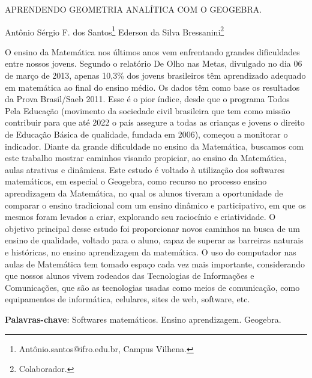 \documentclass[article,12pt,onesidea,4paper,english,brazil]{abntex2}
\begin{document}
	
	
	\frenchspacing 
	
	\begin{center}
		\LARGE APRENDENDO GEOMETRIA ANALÍTICA COM O GEOGEBRA.
		
		\normalsize
    	Antônio Sérgio F. dos Santos\footnote{Antônio.santos@ifro.edu.br, Campus Vilhena.} 
		Ederson da Silva Bressanini\footnote{Colaborador.} 
	\end{center}
	
	\noindent O ensino da Matemática nos últimos anos vem enfrentando grandes dificuldades entre nossos jovens. Segundo o relatório De Olho nas Metas, divulgado no dia 06 de março de 2013, apenas 10,3\% dos jovens brasileiros têm aprendizado adequado em matemática ao final do ensino médio. Os dados têm como base os resultados da Prova Brasil/Saeb 2011. Esse é o pior índice, desde que o programa Todos Pela Educação (movimento da sociedade civil brasileira que tem como missão contribuir para que até 2022 o país assegure a todas as crianças e jovens o direito de Educação Básica de qualidade, fundada em 2006), começou a monitorar o indicador. Diante da grande dificuldade no ensino da Matemática, buscamos com este trabalho mostrar caminhos visando propiciar, ao ensino da Matemática, aulas atrativas e dinâmicas. Este estudo é voltado à utilização dos softwares matemáticos, em especial o Geogebra, como recurso no processo ensino aprendizagem da Matemática, no qual os alunos tiveram a oportunidade de comparar o ensino tradicional com um ensino dinâmico e participativo, em que os mesmos foram levados a criar, explorando seu raciocínio e criatividade. O objetivo principal desse estudo foi proporcionar novos caminhos na busca de um ensino de qualidade, voltado para o aluno, capaz de superar as barreiras naturais e históricas, no ensino aprendizagem da matemática. O uso do computador nas aulas de Matemática tem tomado espaço cada vez mais importante, considerando que nossos alunos vivem rodeados das Tecnologias de Informações e Comunicações, que são as tecnologias usadas como meios de comunicação, como equipamentos de informática, celulares, sites de web, software, etc.
	
	\vspace{\onelineskip}
	
	\noindent
	\textbf{Palavras-chave}: Softwares matemáticos. Ensino aprendizagem. Geogebra.
	
\end{document}
